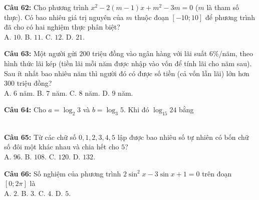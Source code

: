 \documentclass[12pt,a4paper]{article}
\begin{document}


\vspace{0.3cm}

\noindent \textbf{Câu 62:} Cho phương trình $x^2-2(m-1)x+m^2-3m=0$ ($m$ là tham số thực). Có bao nhiêu giá trị nguyên của $m$ thuộc đoạn $[-10;10]$ để phương trình đã cho có hai nghiệm thực phân biệt?\\
\noindent A. $10$. \hfill B. $11$. \hfill C. $12$. \hfill D. $21$.



\vspace{0.3cm}

\noindent \textbf{Câu 63:} Một người gửi $200$ triệu đồng vào ngân hàng với lãi suất $6\%$/năm, theo hình thức lãi kép (tiền lãi mỗi năm được nhập vào vốn để tính lãi cho năm sau). Sau ít nhất bao nhiêu năm thì người đó có được số tiền (cả vốn lẫn lãi) lớn hơn $300$ triệu đồng?\\
\noindent A. $6$ năm. \hfill B. $7$ năm. \hfill C. $8$ năm. \hfill D. $9$ năm.



\vspace{0.3cm}

\noindent \textbf{Câu 64:} Cho $a=\log_2 3$ và $b=\log_3 5$. Khi đó $\log_{15}24$ bằng\\
\noindent{}\\[0.25cm]
\noindent{}



\vspace{0.3cm}

\noindent \textbf{Câu 65:} Từ các chữ số $0,1,2,3,4,5$ lập được bao nhiêu số tự nhiên có bốn chữ số đôi một khác nhau và chia hết cho $5$?\\
\noindent A. $96$. \hfill B. $108$. \hfill C. $120$. \hfill D. $132$.



\vspace{0.3cm}

\noindent \textbf{Câu 66:} Số nghiệm của phương trình $2\sin^2x-3\sin x+1=0$ trên đoạn $[0;2\pi]$ là\\
\noindent A. $2$. \hfill B. $3$. \hfill C. $4$. \hfill D. $5$.
\end{document}
